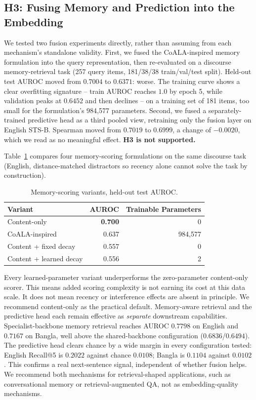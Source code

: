 \documentclass[manuscript]{acmart}
\begin{document}
\subsection{H3: Fusing Memory and Prediction into the Embedding}
\label{sec:results:memory}

We tested two fusion experiments directly, rather than assuming from each mechanism's standalone validity. First, we fused the CoALA-inspired memory formulation into the query representation, then re-evaluated on a discourse memory-retrieval task (257 query items, 181/38/38 train/val/test split). Held-out test AUROC moved from $0.7004$ to $0.6371$: worse. The training curve shows a clear overfitting signature -- train AUROC reaches $1.0$ by epoch 5, while validation peaks at $0.6452$ and then declines -- on a training set of 181 items, too small for the formulation's 984,577 parameters. Second, we fused a separately-trained predictive head as a third pooled view, retraining only the fusion layer on English STS-B. Spearman moved from $0.7019$ to $0.6999$, a change of $-0.0020$, which we read as no meaningful effect. \textbf{H3 is not supported.}

Table~\ref{tab:memory-variants} compares four memory-scoring formulations on the same discourse task (English, distance-matched distractors so recency alone cannot solve the task by construction).

\begin{table}[h]
\caption{Memory-scoring variants, held-out test AUROC.}
\label{tab:memory-variants}
\begin{tabular}{@{}lrr@{}}
\toprule
Variant & AUROC & Trainable Parameters \\
\midrule
Content-only & \textbf{0.700} & 0 \\
CoALA-inspired & 0.637 & 984{,}577 \\
Content + fixed decay & 0.557 & 0 \\
Content + learned decay & 0.556 & 2 \\
\bottomrule
\end{tabular}
\end{table}

Every learned-parameter variant underperforms the zero-parameter content-only scorer. This means added scoring complexity is not earning its cost at this data scale. It does not mean recency or interference effects are absent in principle. We recommend content-only as the practical default. Memory-aware retrieval and the predictive head each remain effective as \emph{separate} downstream capabilities. Specialist-backbone memory retrieval reaches AUROC $0.7798$ on English and $0.7167$ on Bangla, well above the shared-backbone configuration ($0.6836$/$0.6494$). The predictive head clears chance by a wide margin in every configuration tested: English Recall@5 is $0.2022$ against chance $0.0108$; Bangla is $0.1104$ against $0.0102$. This confirms a real next-sentence signal, independent of whether fusion helps. We recommend both mechanisms for retrieval-shaped applications, such as conversational memory or retrieval-augmented QA, not as embedding-quality mechanisms.
\end{document}

